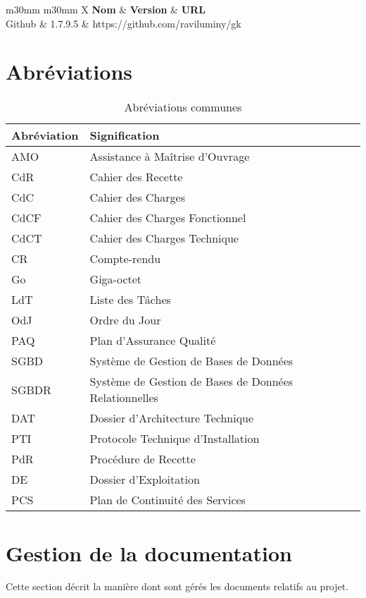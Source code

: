 \documentclass[11pt,fleqn]{report}
\begin{document}
\begin{table}[htbp]
	\centering
	\begin{tabularx}{\linewidth}{m{30mm} m{30mm} X}
		\toprule
		\textbf{Nom} & \textbf{Version} & \textbf{URL} \\
		\midrule
		Github & 1.7.9.5 & https://github.com/raviluminy/gk \\
		\bottomrule
	\end{tabularx}
	\caption{Outils de travail~: partage des fichiers}
	\label{OutilsDepot}
\end{table}

\chapter{Abréviations}
\begin{table}[htbp]
	\centering
	\begin{tabularx}{\linewidth}{m{30mm} X}
		\toprule
		\textbf{Abréviation} & \textbf{Signification} \\
		\midrule
		AMO & Assistance à Maîtrise d'Ouvrage \\
		CdR & Cahier des Recette \\
		CdC & Cahier des Charges \\
		CdCF & Cahier des Charges Fonctionnel \\
		CdCT & Cahier des Charges Technique \\
		CR & Compte-rendu \\
		Go & Giga-octet \\
		LdT & Liste des Tâches \\
		OdJ & Ordre du Jour \\
		PAQ & Plan d'Assurance Qualité \\
		SGBD & Système de Gestion de Bases de Données \\
		SGBDR & Système de Gestion de Bases de Données Relationnelles \\
		DAT & Dossier d'Architecture Technique \\
		PTI & Protocole Technique d'Installation \\
		PdR & Procédure de Recette \\
		DE & Dossier d'Exploitation \\
		PCS & Plan de Continuité des Services \\
		\bottomrule
	\end{tabularx}
	\caption{Abréviations communes}
	\label{AbreviationsCommunes}
\end{table}

\chapter{Gestion de la documentation}
Cette section décrit la manière dont sont gérés les documents relatifs au projet.
\end{document}
